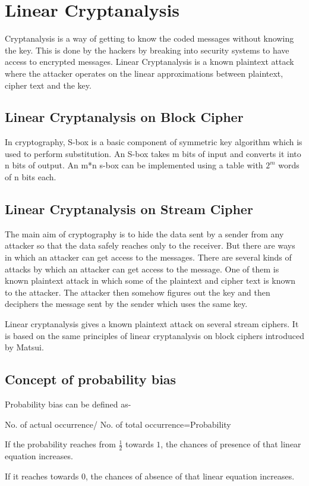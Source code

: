 \documentclass[12pt]{article}
\begin{document}
\section{Linear Cryptanalysis}
Cryptanalysis is a way of getting to know the coded messages without knowing the key. This is done by the hackers by breaking into security systems to have access to encrypted messages. Linear Cryptanalysis is a known plaintext attack where the attacker operates on the linear approximations between plaintext, cipher text and the key.
\subsection{Linear Cryptanalysis on Block Cipher}
In cryptography, S-box is a basic component of symmetric key algorithm which is used to perform substitution. An S-box takes m bits of input and converts it into n bits of output. An m*n s-box can be implemented using a table with $ 2^m $ words of n bits each. 
\subsection{Linear Cryptanalysis on Stream Cipher}
The main aim of cryptography is to hide the data sent by a sender from any attacker so that the data safely reaches only to the receiver. But there are ways in which an attacker can get access to the messages. There are several kinds of attacks by which an attacker can get access to the message. One of them is known plaintext attack in which some of the plaintext and cipher text is known to the attacker. The attacker then somehow figures out the key and then deciphers the message sent by the sender which uses the same key. 

Linear cryptanalysis gives a known plaintext attack on several stream ciphers. It is based on the same principles of linear cryptanalysis on block ciphers introduced by Matsui. 
\subsection{Concept of probability bias}
Probability bias can be defined as- 

No. of actual occurrence/ No. of total occurrence=Probability 

If the probability reaches from $ \frac{1}{2} $ towards $ 1 $, the chances of presence of that linear equation increases.  

If it reaches towards $ 0 $, the chances of absence of that linear equation increases. 
\end{document}
